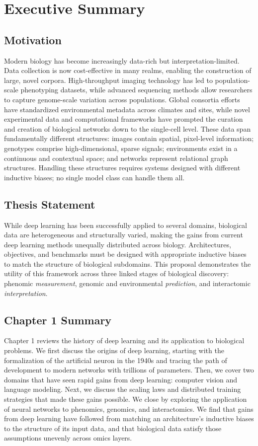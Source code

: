 \chapter*{Executive Summary}\label{ch:exec-sum}
\section*{Motivation}
Modern biology has become increasingly data-rich but interpretation-limited. Data collection is now cost-effective in many realms, enabling the construction of large, novel corpora. High-throughput imaging technology has led to population-scale phenotyping datasets, while advanced sequencing methods allow researchers to capture genome-scale variation across populations. Global consortia efforts have standardized environmental metadata across climates and sites, while novel experimental data and computational frameworks have prompted the curation and creation of biological networks down to the single-cell level. These data span fundamentally different structures: images contain spatial, pixel-level information; genotypes comprise high-dimensional, sparse signals; environments exist in a continuous and contextual space; and networks represent relational graph structures. Handling these structures requires systems designed with different inductive biases; no single model class can handle them all.

\section*{Thesis Statement}
While deep learning has been successfully applied to several domains, biological data are heterogeneous and structurally varied, making the gains from current deep learning methods unequally distributed across biology. Architectures, objectives, and benchmarks must be designed with appropriate inductive biases to match the structure of biological subdomains. This proposal demonstrates the utility of this framework across three linked stages of biological discovery: phenomic \textit{measurement}, genomic and environmental \textit{prediction}, and interactomic \textit{interpretation}.

\section*{Chapter 1 Summary}
Chapter 1 reviews the history of deep learning and its application to biological problems. We first discuss the origins of deep learning, starting with the formalization of the artificial neuron in the 1940s and tracing the path of development to modern networks with trillions of parameters. Then, we cover two domains that have seen rapid gains from deep learning: computer vision and language modeling. Next, we discuss the scaling laws and distributed training strategies that made these gains possible. We close by exploring the application of neural networks to phenomics, genomics, and interactomics. We find that gains from deep learning have followed from matching an architecture's inductive biases to the structure of its input data, and that biological data satisfy those assumptions unevenly across omics layers.

